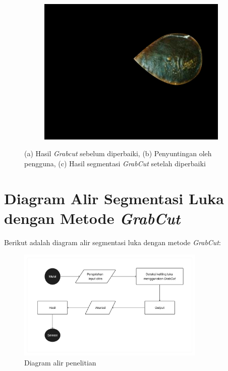 \begin{figure}[H]
\begin{subfigure}{0.3\textwidth}
		\caption{}
	  \end{subfigure}
      \begin{subfigure}{0.3\textwidth}
		\centering{}
		\includegraphics[width=\textwidth]{gambar/res_2.png}
		\caption{}
	  \end{subfigure}
	\caption{
		(a) Hasil \emph{Grabcut} sebelum diperbaiki, (b) Penyuntingan oleh pengguna, (c) Hasil 
        segmentasi \emph{GrabCut} setelah diperbaiki
	 }
  \end{figure}

\section{Diagram Alir Segmentasi Luka dengan Metode \emph{GrabCut}}
Berikut adalah diagram alir segmentasi luka dengan metode \emph{GrabCut}: 
\begin{figure}[H]
	\centering{}
	\includegraphics[width=0.8\textwidth]{gambar/diagram_penelitian.png}
	\caption{Diagram alir penelitian}
	\label{img:diagram_penelitian}
  \end{figure}

